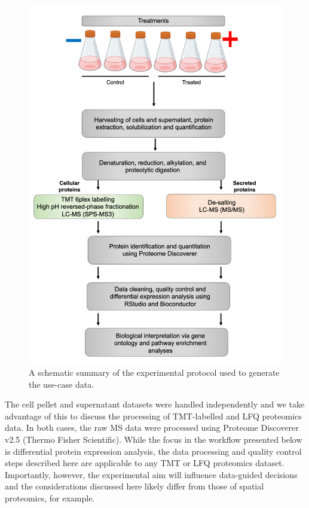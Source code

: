 \documentclass[9pt,a4paper,]{extarticle}
\begin{document}
\begin{figure}

{\centering \includegraphics[width=1\linewidth]{Images/experimental-method} 

}

\caption{A schematic summary of the experimental protocol used to generate the use-case data.}\label{fig:experimental-method}
\end{figure}

The cell pellet and supernatant datasets were handled independently and we take
advantage of this to discuss the processing of TMT-labelled and LFQ proteomics
data. In both cases, the raw MS data were processed using Proteome Discoverer
v2.5 (Thermo Fisher Scientific). While the focus in the workflow presented below
is differential protein expression analysis, the data processing and quality
control steps described here are applicable to any TMT or LFQ proteomics dataset.
Importantly, however, the experimental aim will influence data-guided decisions
and the considerations discussed here likely differ from those of spatial proteomics,
for example.
\end{document}

